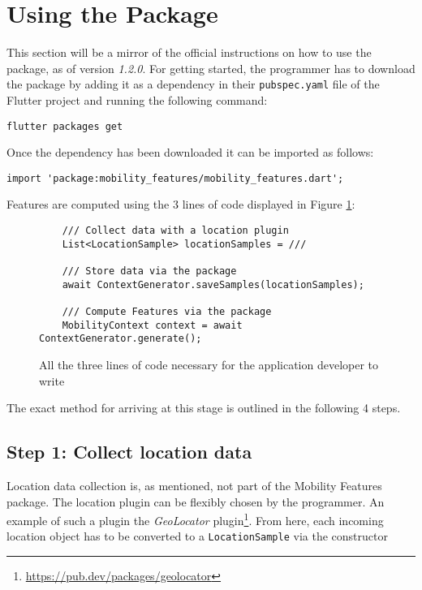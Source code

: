 \section{Using the Package}
This section will be a mirror of the official instructions on how to use the package, as of version \textit{1.2.0}. For getting started, the programmer has to download the package by adding it as a dependency in their \verb|pubspec.yaml| file of the Flutter project and running the following command:

\begin{verbatim}
flutter packages get
\end{verbatim}

Once the dependency has been downloaded it can be imported as follows:

\begin{verbatim}
import 'package:mobility_features/mobility_features.dart';
\end{verbatim}

Features are computed using the 3 lines of code displayed in Figure \ref{fig:code-example-intro}:

\begin{figure}[h]
    \centering
    \begin{verbatim}
    /// Collect data with a location plugin
    List<LocationSample> locationSamples = ///

    /// Store data via the package
    await ContextGenerator.saveSamples(locationSamples);
    
    /// Compute Features via the package
    MobilityContext context = await ContextGenerator.generate();
    \end{verbatim}
    \caption{All the three lines of code necessary for the application developer to write}
    \label{fig:code-example-intro}
\end{figure}

The exact method for arriving at this stage is outlined in the following 4 steps.

\subsection*{Step 1: Collect location data}
Location data collection is, as mentioned, not part of the Mobility Features package. The location plugin can be flexibly chosen by the programmer. An example of such a plugin the \textit{GeoLocator} plugin\footnote{\url{https://pub.dev/packages/geolocator}}. From here, each incoming location object has to be converted to a \verb|LocationSample| via the constructor

